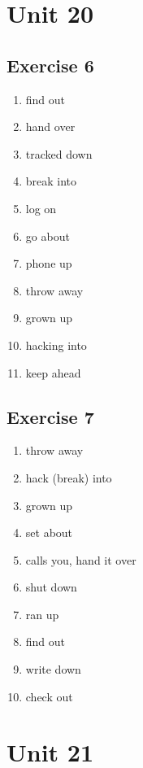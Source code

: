 \documentclass[a5paper,10pt,notitlepage,pdftex,headsepline]{scrartcl}
\begin{document}
\section{Unit 20}
  \subsection{Exercise 6}
    \begin{enumerate}
      \item find out
      \item hand over
      \item tracked down
      \item break into
      \item log on
      \item go about
      \item phone up
      \item throw away
      \item grown up
      \item hacking into
      \item keep ahead
    \end{enumerate}
  \subsection{Exercise 7}
    \begin{enumerate}
      \item throw away
      \item hack (break) into
      \item grown up
      \item set about
      \item calls you, hand it over
      \item shut down
      \item ran up
      \item find out
      \item write down
      \item check out
    \end{enumerate}
\section{Unit 21}
\end{document}
